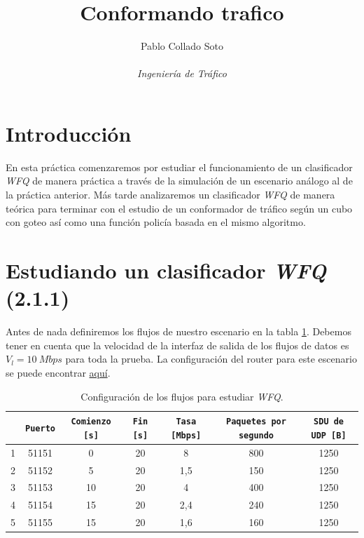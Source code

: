\documentclass[11pt]{article}
\title{Conformando trafico}
\author{Pablo Collado Soto \\ \\ \textit{Ingeniería de Tráfico}}
\date{}
\begin{document}
    \maketitle

    \section{Introducción}
        En esta práctica comenzaremos por estudiar el funcionamiento de un clasificador \textit{WFQ} de manera práctica a través de la simulación de un escenario análogo al de la práctica anterior. Más tarde analizaremos un clasificador \textit{WFQ} de manera teórica para terminar con el estudio de un conformador de tráfico según un cubo con goteo así como una función policía basada en el mismo algoritmo.

    \section{Estudiando un clasificador \textit{WFQ} (2.1.1)}
        Antes de nada definiremos los flujos de nuestro escenario en la tabla \ref{tab:wfqFlows}. Debemos tener en cuenta que la velocidad de la interfaz de salida de los flujos de datos es $V_l = 10\ Mbps$ para toda la prueba. La configuración del router para este escenario se puede encontrar \href{https://github.com/UAH-s-Telematics-Engineering-Tasks/traff_eng/blob/master/P2/Router_confs/originalWFQ.cfg}{aquí}.

        \begin{table}
            \centering
            \begin{tabular}{|c|c|c|c|c|c|c|}
                \hline
                & \texttt{Puerto} & \texttt{Comienzo [s]} & \texttt{Fin [s]} & \texttt{Tasa [Mbps]} & \texttt{Paquetes por segundo} & \texttt{SDU de UDP [B]}\\
                \hline
                1 & 51151 & 0 & 20 & 8 & 800 & 1250\\
                \hline
                2 & 51152 & 5 & 20 & 1,5 & 150 & 1250\\
                \hline
                3 & 51153 & 10 & 20 & 4 & 400 & 1250\\
                \hline
                4 & 51154 & 15 & 20 & 2,4 & 240 & 1250\\
                \hline
                5 & 51155 & 15 & 20 & 1,6 & 160 & 1250\\
                \hline
            \end{tabular}
            \caption{Configuración de los flujos para estudiar \textit{WFQ}.}
            \label{tab:wfqFlows}
        \end{table}
\end{document}
